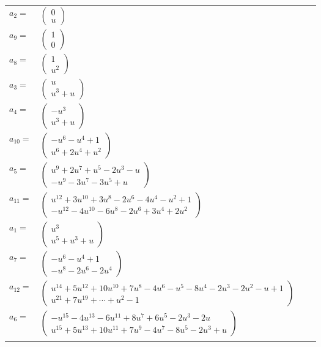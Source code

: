\documentclass[1p]{elsarticle_modified}
\theoremstyle{definition}
\begin{document}
\begin{tabular}{m{7pt} m{180pt} m{7pt} m{180pt} }
\flushright $a_{2}=$&$\begin{pmatrix}0\\u\end{pmatrix}$ \\
\flushright $a_{9}=$&$\begin{pmatrix}1\\0\end{pmatrix}$ \\
\flushright $a_{8}=$&$\begin{pmatrix}1\\u^2\end{pmatrix}$ \\
\flushright $a_{3}=$&$\begin{pmatrix}u\\u^3+u\end{pmatrix}$ \\
\flushright $a_{4}=$&$\begin{pmatrix}- u^3\\u^3+u\end{pmatrix}$ \\
\flushright $a_{10}=$&$\begin{pmatrix}- u^6- u^4+1\\u^6+2 u^4+u^2\end{pmatrix}$ \\
\flushright $a_{5}=$&$\begin{pmatrix}u^9+2 u^7+u^5-2 u^3- u\\- u^9-3 u^7-3 u^5+u\end{pmatrix}$ \\
\flushright $a_{11}=$&$\begin{pmatrix}u^{12}+3 u^{10}+3 u^8-2 u^6-4 u^4- u^2+1\\- u^{12}-4 u^{10}-6 u^8-2 u^6+3 u^4+2 u^2\end{pmatrix}$ \\
\flushright $a_{1}=$&$\begin{pmatrix}u^3\\u^5+u^3+u\end{pmatrix}$ \\
\flushright $a_{7}=$&$\begin{pmatrix}- u^6- u^4+1\\- u^8-2 u^6-2 u^4\end{pmatrix}$ \\
\flushright $a_{12}=$&$\begin{pmatrix}u^{14}+5 u^{12}+10 u^{10}+7 u^8-4 u^6- u^5-8 u^4-2 u^3-2 u^2- u+1\\u^{21}+7 u^{19}+\cdots+u^2-1\end{pmatrix}$ \\
\flushright $a_{6}=$&$\begin{pmatrix}- u^{15}-4 u^{13}-6 u^{11}+8 u^7+6 u^5-2 u^3-2 u\\u^{15}+5 u^{13}+10 u^{11}+7 u^9-4 u^7-8 u^5-2 u^3+u\end{pmatrix}$\\&\end{tabular}
\end{document}
